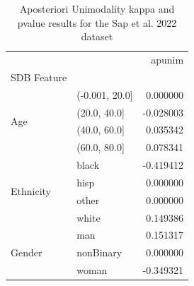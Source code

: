 \begin{table}
\caption{Aposteriori Unimodality kappa and pvalue results for the Sap et al. 2022 dataset}
\label{tab:results_apunim_only_sap}
\begin{tabular}{llr}
\toprule
 &  & apunim \\
SDB Feature &  &  \\
\midrule
\multirow[t]{4}{*}{Age} & (-0.001, 20.0] & 0.000000 \\
 & (20.0, 40.0] & -0.028003 \\
 & (40.0, 60.0] & 0.035342 \\
 & (60.0, 80.0] & 0.078341 \\
\cline{1-3}
\multirow[t]{4}{*}{Ethnicity} & black & -0.419412 \\
 & hisp & 0.000000 \\
 & other & 0.000000 \\
 & white & 0.149386 \\
\cline{1-3}
\multirow[t]{3}{*}{Gender} & man & 0.151317 \\
 & nonBinary & 0.000000 \\
 & woman & -0.349321 \\
\cline{1-3}
\bottomrule
\end{tabular}
\end{table}
